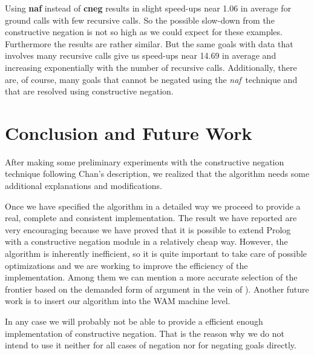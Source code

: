 \documentclass{llncs}
\newcommand{\naf}{{\em naf}}\newcommand{\viejo}[1]{}
\begin{document}
Using {\bf naf} instead of {\bf cneg} results in slight speed-ups near
1.06 in average for ground calls with few recursive calls. So the
possible slow-down from the constructive negation is not so high as we
could expect for these examples. Furthermore the results are rather
similar. But the same goals with data that involves many recursive
calls give us speed-ups near 14.69 in average and increasing
exponentially with the number of recursive calls. Additionally, there
are, of course, many goals that cannot be negated using the \naf\
technique and that are resolved using constructive negation. 

 


\section{Conclusion and Future Work}
\label{conclusion}
After making some preliminary experiments with the constructive 
negation technique  following Chan's description, we realized that the
algorithm needs some additional explanations and modifications.

Once we have specified the algorithm in a detailed way we proceed to provide
a real, complete and consistent implementation. The result we have reported are
very encouraging because we have proved that it is possible to extend
Prolog with a constructive negation module in a relatively cheap way.
However, the algorithm is inherently inefficient, so it is quite 
important to take care of possible optimizations and we are working 
to improve the efficiency of the implementation. Among them we can mention
a more accurate selection of the frontier based on the demanded form
of argument in the vein of \cite{Moreno2}). Another future work is
to insert our algorithm into the WAM machine level.

In any case we will probably not be able to provide a efficient enough implementation
of constructive negation. That is
the reason why we do not intend to use it neither for all cases of
negation nor for negating goals directly.
\end{document}
